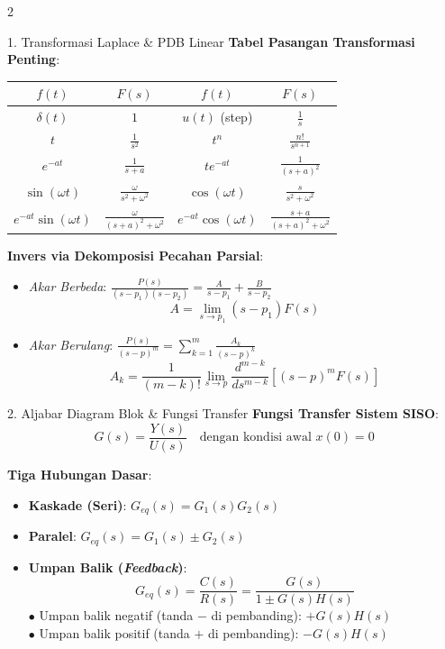 \documentclass[10pt,a4paper]{article}
\begin{document}
\begin{multicols*}{2}
\begin{rumusbox}{1. Transformasi Laplace \& PDB Linear}
\textbf{Tabel Pasangan Transformasi Penting}:
\begin{center}
\renewcommand{\arraystretch}{1.2}
\scriptsize
\begin{tabular}{cc|cc}
\toprule
$f(t)$ & $F(s)$ & $f(t)$ & $F(s)$ \\
\midrule
$\delta(t)$ & $1$ & $u(t)$ (step) & $\frac{1}{s}$ \\
$t$ & $\frac{1}{s^2}$ & $t^n$ & $\frac{n!}{s^{n+1}}$ \\
$e^{-at}$ & $\frac{1}{s+a}$ & $t e^{-at}$ & $\frac{1}{(s+a)^2}$ \\
$\sin(\omega t)$ & $\frac{\omega}{s^2+\omega^2}$ & $\cos(\omega t)$ & $\frac{s}{s^2+\omega^2}$ \\
$e^{-at}\sin(\omega t)$ & $\frac{\omega}{(s+a)^2+\omega^2}$ & $e^{-at}\cos(\omega t)$ & $\frac{s+a}{(s+a)^2+\omega^2}$ \\
\bottomrule
\end{tabular}
\end{center}

\textbf{Invers via Dekomposisi Pecahan Parsial}:
\begin{itemize}\setlength\itemsep{1pt}
    \item \textit{Akar Berbeda}: $\frac{P(s)}{(s-p_1)(s-p_2)} = \frac{A}{s-p_1} + \frac{B}{s-p_2}$
    $$A = \lim_{s \to p_1} (s-p_1) F(s)$$
    \item \textit{Akar Berulang}: $\frac{P(s)}{(s-p)^m} = \sum_{k=1}^m \frac{A_k}{(s-p)^k}$
    $$A_k = \frac{1}{(m-k)!} \lim_{s \to p} \frac{d^{m-k}}{ds^{m-k}} \left[ (s-p)^m F(s) \right]$$
\end{itemize}
\end{rumusbox}

\begin{rumusbox}{2. Aljabar Diagram Blok \& Fungsi Transfer}
\textbf{Fungsi Transfer Sistem SISO}:
$$G(s) = \frac{Y(s)}{U(s)} \quad \text{dengan kondisi awal } x(0) = 0$$

\textbf{Tiga Hubungan Dasar}:
\begin{itemize}\setlength\itemsep{2pt}
    \item \textbf{Kaskade (Seri)}: $G_{eq}(s) = G_1(s) G_2(s)$
    \item \textbf{Paralel}: $G_{eq}(s) = G_1(s) \pm G_2(s)$
    \item \textbf{Umpan Balik (\textit{Feedback})}:
    $$G_{eq}(s) = \frac{C(s)}{R(s)} = \frac{G(s)}{1 \pm G(s)H(s)}$$
    $\bullet$ Umpan balik negatif (tanda $-$ di pembanding): $+G(s)H(s)$\\
    $\bullet$ Umpan balik positif (tanda $+$ di pembanding): $-G(s)H(s)$
\end{itemize}


\end{rumusbox}
\end{multicols*}
\end{document}
